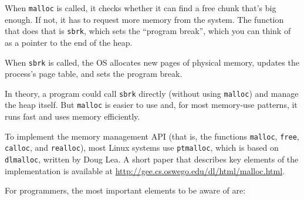 \documentclass[12pt]{book}
\begin{document}
When {\tt malloc} is called, it checks whether it can find a free
chunk that's big enough.  If not, it has to request more memory
from the system.  The function that does that is {\tt sbrk},
which sets the ``program break'', which you can think of as a pointer
to the end of the heap.

When {\tt sbrk} is called, the OS allocates new pages of physical
memory, updates the process's page table, and sets the program
break.

In theory, a program could call {\tt sbrk} directly (without using
{\tt malloc}) and manage the heap itself.  But {\tt malloc} is easier
to use and, for most memory-use patterns, it runs fast and uses memory
efficiently.

To implement the memory management API (that is, the functions
{\tt malloc}, {\tt free}, {\tt calloc}, and {\tt realloc}),
most Linux systems use {\tt ptmalloc},
which is based on {\tt dlmalloc}, written by Doug Lea.  A short paper
that describes key elements of the implementation is
available at \url{http://gee.cs.oswego.edu/dl/html/malloc.html}.

For programmers, the most important elements to be aware of are:
\end{document}
